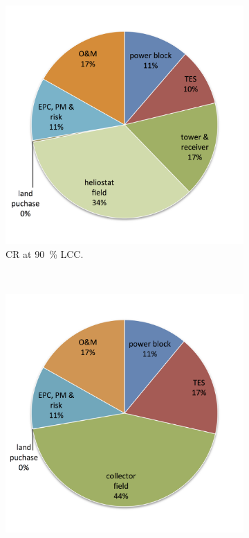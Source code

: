 \begin{figure}[!htbp]
        \centering                
        \begin{subfigure}[b]{0.5\textwidth}
                \centering
                \includegraphics[width=1\textwidth]{FIG/CR_LCOE_90_BreakDown}
                \caption{CR at \SI{90}{\percent} LCC.}\label{CR_LCOE_90_BreakDown}
        \end{subfigure}%
        ~
        \begin{subfigure}[b]{0.5\textwidth}
                \centering
                \includegraphics[width=1\textwidth]{FIG/PTC_LCOE_90_BreakDown}

\end{subfigure}
\end{figure}
